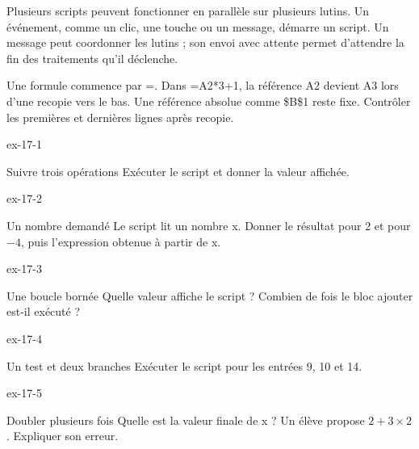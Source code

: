 \begin{definition}Plusieurs scripts peuvent fonctionner en parallèle sur plusieurs lutins. Un événement, comme un clic, une touche ou un message, démarre un script. Un message peut coordonner les lutins ; son envoi avec attente permet d’attendre la fin des traitements qu’il déclenche.\end{definition}
\begin{savoirfaire}[Tableur]Une formule commence par =. Dans =A2*3+1, la référence A2 devient A3 lors d’une recopie vers le bas. Une référence absolue comme \$B\$1 reste fixe. Contrôler les premières et dernières lignes après recopie.\end{savoirfaire}
\clearpage{}
\begin{blocLivre}{ex-17-1}\begin{exercice}[1]{Suivre trois opérations}
Exécuter le script et donner la valeur affichée.
\label{fig-ex-17-1}
\end{exercice}\end{blocLivre}
\begin{blocLivre}{ex-17-2}\begin{exercice}[1]{Un nombre demandé}
Le script lit un nombre x. Donner le résultat pour 2 et pour $-4$, puis l’expression obtenue à partir de x.
\label{fig-ex-17-2}
\end{exercice}\end{blocLivre}
\begin{blocLivre}{ex-17-3}\begin{exercice}[1]{Une boucle bornée}
Quelle valeur affiche le script ? Combien de fois le bloc ajouter est-il exécuté ?
\label{fig-ex-17-3}
\end{exercice}\end{blocLivre}
\begin{blocLivre}{ex-17-4}\begin{exercice}[1]{Un test et deux branches}
Exécuter le script pour les entrées 9, 10 et 14.
\label{fig-ex-17-4}
\end{exercice}\end{blocLivre}
\begin{blocLivre}{ex-17-5}\begin{exercice}[1]{Doubler plusieurs fois}
Quelle est la valeur finale de x ? Un élève propose $2+3\times2$. Expliquer son erreur.
\label{fig-ex-17-5}
\end{exercice}\end{blocLivre}

